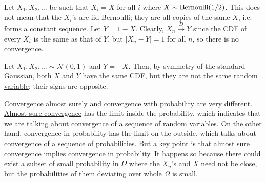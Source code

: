   \begin{example}
    \label{ex:c-in-distribution-centernotimplies-c-in}
    Let $X_1, X_2, \ldots$ be such that $X_i = X$ for all $i$ where $X \sim \operatorname{Bernoulli}(1/2)$. This does not mean that the $X_i$'s are iid Bernoulli; they are all copies of the same $X$, i.e. forms a constant sequence. Let $Y = 1 - X$. Clearly, $X_n \xrightarrow{D} Y$ since the CDF of every $X_i$ is the same as that of $Y$, but $|X_n - Y| = 1$ for all $n$, so there is no convergence.  
  \end{example}

  \begin{example}
    \label{ex:c-in-distribution-centernotimplies-c-in-2}
    Let $X_1, X_2, \ldots \sim \mathcal{N}(0, 1)$ and $Y = -X$. Then, by symmetry of the standard Gaussian, both $X$ and $Y$ have the same CDF, but they are not the same \hyperref[def:random-variable]{random variable}: their signs are opposite. 
  \end{example}

  Convergence almost surely and convergence with probability are very different. \hyperref[mt-def:almost-sure-convergence]{Almost sure convergence} has the limit inside the probability, which indicates that we are talking about convergence of a sequence of \hyperref[def:random-variable]{random variables}. On the other hand, convergence in probability has the limit on the outside, which talks about convergence of a sequence of probabilities. But a key point is that almost sure convergence implies convergence in probability. It happens so because there could exist a subset of small probability in $\Omega$ where the $X_n$'s and $X$ need not be close, but the probabilities of them deviating over whole $\Omega$ is small. 

